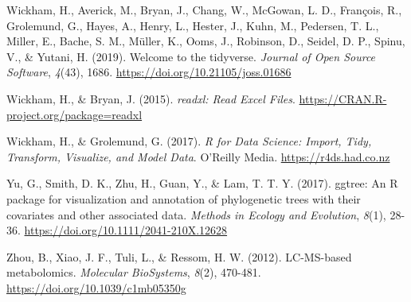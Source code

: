 \documentclass[
  spanish,
  letterpaper,
  DIV=11,
  numbers=noendperiod]{scrreprt}
\newlength{\cslhangindent}
\newenvironment{CSLReferences}[2] %
 {\begin{list}{}{%
  \setlength{\itemindent}{0pt}
  \setlength{\leftmargin}{0pt}
  \setlength{\parsep}{0pt}
  \ifodd #1
   \setlength{\leftmargin}{\cslhangindent}
   \setlength{\itemindent}{-1\cslhangindent}
  \fi
  \setlength{\itemsep}{#2\baselineskip}}}
 {\end{list}}
\begin{document}
\begin{CSLReferences}{1}{0}
Wickham, H., Averick, M., Bryan, J., Chang, W., McGowan, L. D.,
François, R., Grolemund, G., Hayes, A., Henry, L., Hester, J., Kuhn, M.,
Pedersen, T. L., Miller, E., Bache, S. M., Müller, K., Ooms, J.,
Robinson, D., Seidel, D. P., Spinu, V., \& Yutani, H. (2019). {Welcome
to the tidyverse}. \emph{Journal of Open Source Software}, \emph{4}(43),
1686. \url{https://doi.org/10.21105/joss.01686}

Wickham, H., \& Bryan, J. (2015). \emph{readxl: Read Excel Files}.
\url{https://CRAN.R-project.org/package=readxl}

Wickham, H., \& Grolemund, G. (2017). \emph{R for Data Science: Import,
Tidy, Transform, Visualize, and Model Data}. O'Reilly Media.
\url{https://r4ds.had.co.nz}

Yu, G., Smith, D. K., Zhu, H., Guan, Y., \& Lam, T. T. Y. (2017).
{ggtree: An R package for visualization and annotation of phylogenetic
trees with their covariates and other associated data}. \emph{Methods in
Ecology and Evolution}, \emph{8}(1), 28-36.
\url{https://doi.org/10.1111/2041-210X.12628}

Zhou, B., Xiao, J. F., Tuli, L., \& Ressom, H. W. (2012). LC-MS-based
metabolomics. \emph{Molecular BioSystems}, \emph{8}(2), 470-481.
\url{https://doi.org/10.1039/c1mb05350g}

\end{CSLReferences}
\end{document}
